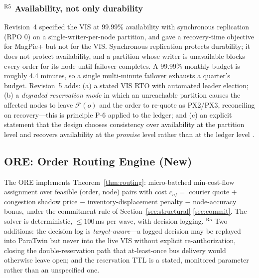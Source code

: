 \subsubsection*{$^{\mathrm{R5}}$ Availability, not only durability}
Revision~4 specified the VIS at 99.99\% availability with synchronous replication (RPO 0) on a single-writer-per-node partition, and gave a recovery-time objective for MagPie+ but not for the VIS. Synchronous replication protects durability; it does not protect availability, and a partition whose writer is unavailable blocks every order for its node until failover completes. A 99.99\% monthly budget is roughly 4.4 minutes, so a single multi-minute failover exhausts a quarter's budget. Revision~5 adds: (a) a stated VIS RTO with automated leader election; (b) a \emph{degraded reservation mode} in which an unreachable partition causes the affected nodes to leave $\mathcal{F}(o)$ and the order to re-quote as PX2/PX3, reconciling on recovery---this is principle P-6 applied to the ledger; and (c) an explicit statement that the design chooses consistency over availability at the partition level and recovers availability at the \emph{promise} level rather than at the ledger level \cite{gilbert2002}. 

\subsection{ORE: Order Routing Engine (New)}
The ORE implements Theorem~\ref{thm:routing}: micro-batched min-cost-flow assignment over feasible (order, node) pairs with cost $c_{of}=$ courier quote $+$ congestion shadow price $-$ inventory-displacement penalty $-$ node-accuracy bonus, under the commitment rule of Section~\ref{sec:structural}-\ref{sec:commit}. The solver is deterministic, $\le100$\,ms per wave, with decision logging. $^{\mathrm{R5}}$ Two additions: the decision log is \emph{target-aware}---a logged decision may be replayed into ParaTwin but never into the live VIS without explicit re-authorization, closing the double-reservation path that at-least-once bus delivery would otherwise leave open; and the reservation TTL is a stated, monitored parameter rather than an unspecified one. 

